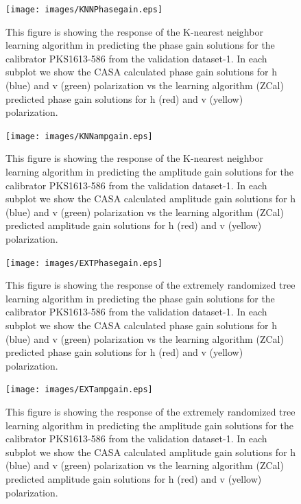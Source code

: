 \begin{figure}[H]
    \texttt{[image: images/KNNPhasegain.eps]}
    \caption{This figure is showing the response of the K-nearest neighbor learning algorithm in predicting the phase gain solutions for the calibrator PKS1613-586 from the validation dataset-1. In each subplot we show the CASA calculated phase gain solutions for h (blue) and v (green) polarization vs the learning algorithm (ZCal) predicted phase gain solutions for h (red) and v (yellow) polarization.}
    \label{obs3}
\end{figure}

\begin{figure}[H]
    \texttt{[image: images/KNNampgain.eps]}
    \caption{This figure is showing the response of the K-nearest neighbor learning algorithm in predicting the amplitude gain solutions for the calibrator PKS1613-586 from the validation dataset-1. In each subplot we show the CASA calculated amplitude gain solutions for h (blue) and v (green) polarization vs the learning algorithm (ZCal) predicted amplitude gain solutions for h (red) and v (yellow) polarization.}
     \label{ka1}
\end{figure}

\begin{figure}[H]
    \texttt{[image: images/EXTPhasegain.eps]}
    \caption{This figure is showing the response of the extremely randomized tree learning algorithm in predicting the phase gain solutions for the calibrator PKS1613-586 from the validation dataset-1. In each subplot we show the CASA calculated phase gain solutions for h (blue) and v (green) polarization vs the learning algorithm (ZCal) predicted phase gain solutions for h (red) and v (yellow) polarization.}
    \label{obs4}
\end{figure}

\begin{figure}[H]
    \texttt{[image: images/EXTampgain.eps]}
    \caption{This figure is showing the response of the extremely randomized tree learning algorithm in predicting the amplitude gain solutions for the calibrator PKS1613-586 from the validation dataset-1. In each subplot we show the CASA calculated amplitude gain solutions for h (blue) and v (green) polarization vs the learning algorithm (ZCal) predicted amplitude gain solutions for h (red) and v (yellow) polarization.}
     \label{ea1}
\end{figure}


